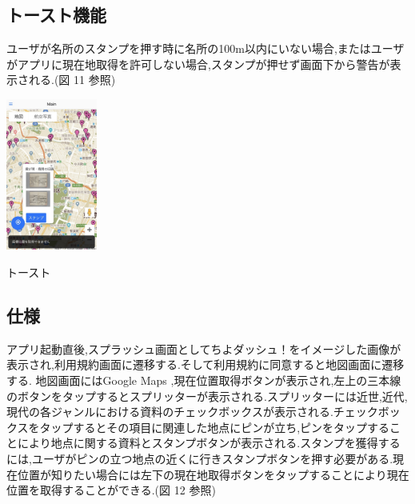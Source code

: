 \documentclass[a4paper, twoside]{jarticle}
\makeatletter
\newenvironment{figurehere}
  {\def\@captype{figure}}
  {}
\makeatother
\begin{document}
\begin{multicols}{2}
\subsection{トースト機能}
ユーザが名所のスタンプを押す時に名所の100m以内にいない場合,またはユーザがアプリに現在地取得を許可しない場合,スタンプが押せず画面下から警告が表示される.(図 11 参照)
\begin{figurehere}
\begin{center}
\includegraphics[bb=30 50 550 1300,width=3cm]{./image11.jpg}%
\end{center}
\caption{トースト}\label{fig:11}
\end{figurehere}



\subsection{仕様}
アプリ起動直後,スプラッシュ画面としてちよダッシュ！をイメージした画像が表示され,利用規約画面に遷移する.そして利用規約に同意すると地図画面に遷移する.
地図画面にはGoogle Maps ,現在位置取得ボタンが表示され,左上の三本線のボタンをタップするとスプリッターが表示される.スプリッターには近世,近代,現代の各ジャンルにおける資料のチェックボックスが表示される.チェックボックスをタップするとその項目に関連した地点にピンが立ち,ピンをタップすることにより地点に関する資料とスタンプボタンが表示される.スタンプを獲得するには,ユーザがピンの立つ地点の近くに行きスタンプボタンを押す必要がある.現在位置が知りたい場合には左下の現在地取得ボタンをタップすることにより現在位置を取得することができる.(図 12 参照)


\end{multicols}
\end{document}
